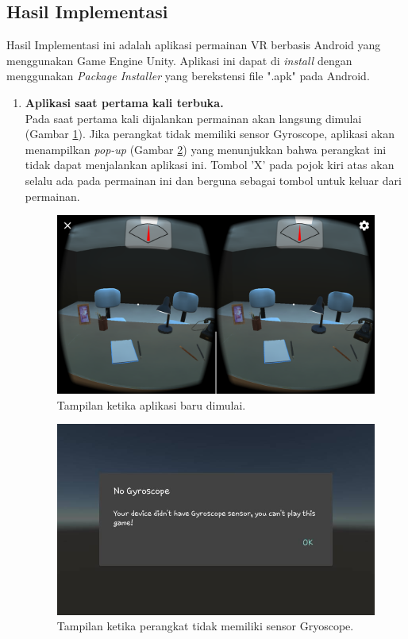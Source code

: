 \subsection{Hasil Implementasi}

Hasil Implementasi ini adalah aplikasi permainan VR berbasis Android yang menggunakan Game Engine Unity. Aplikasi ini dapat di \textit{install} dengan menggunakan \textit{Package Installer} yang berekstensi file ".apk" pada Android.

\begin{enumerate}
    \item \textbf{Aplikasi saat pertama kali terbuka.}\\
    Pada saat pertama kali dijalankan permainan akan langsung dimulai (Gambar \ref{fig:aplikasi_mulai}). Jika perangkat tidak memiliki sensor Gyroscope, aplikasi akan menampilkan \textit{pop-up} (Gambar \ref{fig:no_gyroscope}) yang menunjukkan bahwa perangkat ini tidak dapat menjalankan aplikasi ini. Tombol 'X' pada pojok kiri atas akan selalu ada pada permainan ini dan berguna sebagai tombol untuk keluar dari permainan.
    
    \begin{figure}[htbp]
    \centering
    \includegraphics[scale=0.23]{Gambar/screenshot-aplikasi/aplikasi-mulai.png}
    \caption{Tampilan ketika aplikasi baru dimulai.} 
    \label{fig:aplikasi_mulai}
    \end{figure}
    
    \begin{figure}[htbp]
    \centering
    \includegraphics[scale=0.3]{Gambar/screenshot-aplikasi/no-gyroscope.jpg}
    \caption{Tampilan ketika perangkat tidak memiliki sensor Gryoscope.} 
    \label{fig:no_gyroscope}
    \end{figure}
    

\end{enumerate}

